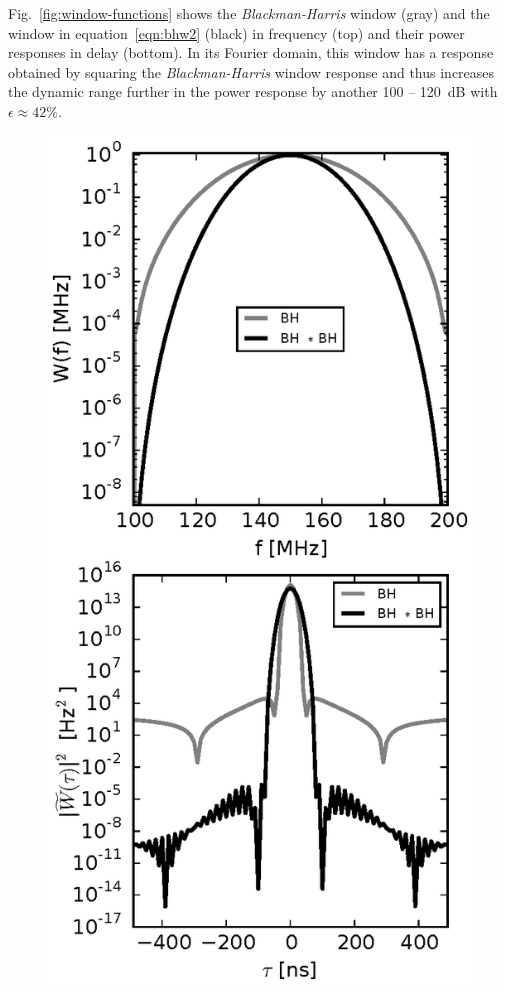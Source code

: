 \documentclass[preprint2,iop,numberedappendix,twocolappendix,appendixfloats]{emulateapj}
\begin{document}
Fig.~\ref{fig:window-functions} shows the {\it Blackman-Harris} window (gray) and  the window in equation~\ref{eqn:bhw2} (black) in frequency (top) and their power responses in delay (bottom). In its Fourier domain, this window has a response obtained by squaring the {\it Blackman-Harris} window response and thus increases the dynamic range further in the power response by another 100 -- 120~dB with $\epsilon\approx 42\%$.

\begin{figure}[htb]
  \centering
  \includegraphics[width=\linewidth]{window_function_modifications.eps}

\end{figure}
\end{document}
